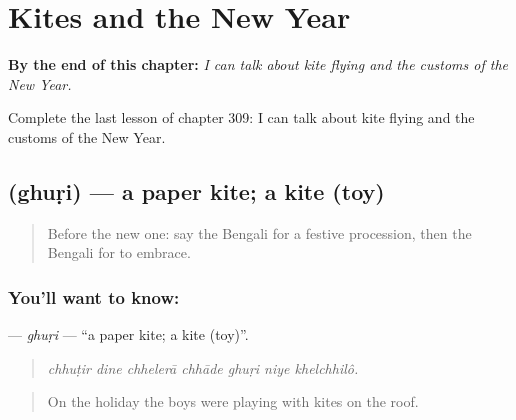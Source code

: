 
\chapter{Kites and the New Year}
\label{ch:bn-kites-and-the-new-year}

\begin{chapteropening}
\textbf{By the end of this chapter:} \emph{I can talk about kite flying and the customs of the New Year.}

Complete the last lesson of chapter 309: I can talk about kite flying and the customs of the New Year.
\end{chapteropening}

\section[\texorpdfstring{\bn{ঘুড়ি} (ghuṛi)}{ঘুড়ি (ghuṛi)}]{ (ghuṛi) — a paper kite; a kite (toy)}

\label{lesson:BN-C309-ghuri}



\begin{quote}
Before the new one: say the Bengali for a festive procession, then the Bengali for to embrace.
\end{quote}

\subsection*{You'll want to know: }
\textbf{} — \emph{ghuṛi} — \textquotedblleft{}a paper kite; a kite (toy)\textquotedblright{}.

\begin{quote}
      
\end{quote}

\begin{quote}
\emph{chhuṭir dine chhelerā chhāde ghuṛi niye khelchhilô.}
\end{quote}

\begin{quote}
On the holiday the boys were playing with kites on the roof.
\end{quote}

